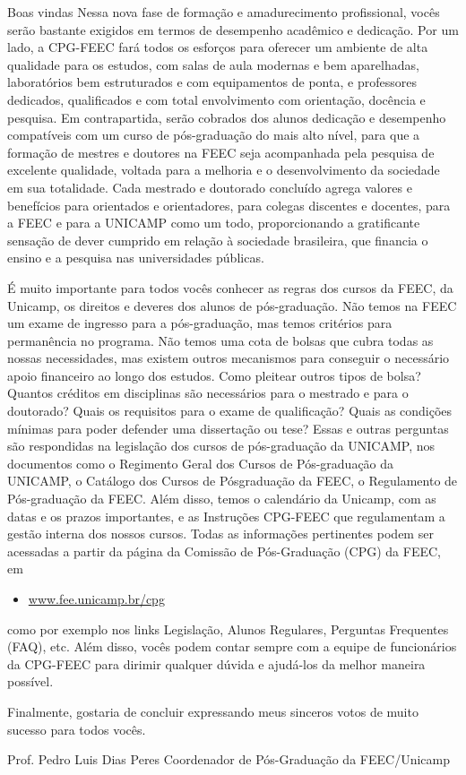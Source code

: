 \begin{story}{Boas vindas}
Nessa nova fase de formação e amadurecimento profissional, vocês serão bastante exigidos em termos de desempenho acadêmico e dedicação. Por um lado, a CPG-FEEC fará todos os esforços para oferecer um ambiente de alta qualidade para os estudos, com salas de aula modernas e bem aparelhadas, laboratórios bem estruturados e com equipamentos de ponta, e professores dedicados, qualificados e com total envolvimento com orientação, docência e pesquisa. Em contrapartida, serão cobrados dos alunos dedicação e desempenho compatíveis com um curso de pós-graduação do mais alto nível, para que a formação de mestres e doutores na FEEC seja acompanhada pela pesquisa de excelente qualidade, voltada para a melhoria e o desenvolvimento da sociedade em sua totalidade. Cada mestrado e doutorado concluído agrega valores e benefícios para orientados e orientadores, para colegas discentes e docentes, para a FEEC e para a UNICAMP como um todo, proporcionando a gratificante sensação de dever cumprido em relação à sociedade brasileira, que financia o ensino e a pesquisa nas universidades públicas.

É muito importante para todos vocês conhecer as regras dos cursos da FEEC, da Unicamp, os direitos e deveres dos alunos de pós-graduação. Não temos na FEEC um exame de ingresso para a pós-graduação, mas temos critérios para permanência no programa. Não temos uma cota de bolsas que cubra todas as nossas necessidades, mas existem outros mecanismos para conseguir o necessário apoio financeiro ao longo dos estudos. Como pleitear outros tipos de bolsa? Quantos créditos em disciplinas são necessários para o mestrado e para o doutorado? Quais os requisitos para o exame de qualificação? Quais as condições mínimas para poder defender uma dissertação ou tese? Essas e outras perguntas são respondidas na legislação dos cursos de pós-graduação da UNICAMP, nos documentos como o Regimento Geral dos Cursos de Pós-graduação da UNICAMP, o Catálogo dos Cursos de Pósgraduação da FEEC, o Regulamento de Pós-graduação da FEEC. Além disso, temos o calendário da Unicamp, com as datas e os prazos importantes, e as Instruções CPG-FEEC que regulamentam a gestão interna dos nossos cursos. Todas as informações pertinentes podem ser acessadas a partir da página da Comissão de Pós-Graduação (CPG) da FEEC, em

\begin{itemize}
\item \url{www.fee.unicamp.br/cpg}
\end{itemize}

como por exemplo nos links Legislação, Alunos Regulares, Perguntas Frequentes (FAQ), etc. Além disso, vocês podem contar sempre com a equipe de funcionários da CPG-FEEC para dirimir qualquer dúvida e ajudá-los da melhor maneira possível.

Finalmente, gostaria de concluir expressando meus sinceros votos de muito sucesso para todos vocês.

\begin{flushright}
Prof. Pedro Luis Dias Peres
Coordenador de Pós-Graduação da FEEC/Unicamp
\end{flushright}

\end{story}